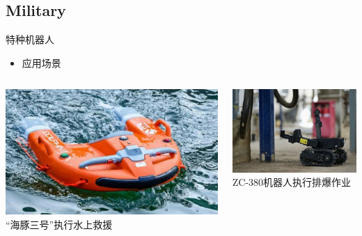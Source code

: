 \documentclass{beamer}
\begin{document}
\subsection{Military}
\begin{frame}{特种机器人}
\setlength{\leftmargini}{0mm}
\begin{itemize}
\item 应用场景
\smallskip
\scriptsize{}
\end{itemize}

\begin{columns}[c, onlytextwidth]
\begin{column}{0.33\textwidth}
\centering
\includegraphics[width=\textwidth, keepaspectratio]{military/1.jpg}
\smallskip
{\tiny “海豚三号”执行水上救援}
\end{column}\hfill

\begin{column}{0.295\textwidth}
\centering
\includegraphics[width=\textwidth, keepaspectratio]{military/2.jpg}
\smallskip
{\tiny ZC-380机器人执行排爆作业}
\end{column}\hfill


\end{columns}
\end{frame}
\end{document}

